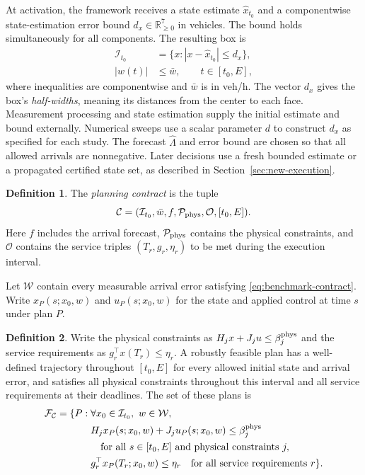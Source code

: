 \documentclass[preprint,12pt]{elsarticle}
\theoremstyle{definition}
\theoremstyle{plain}
\theoremstyle{definition}
\newtheorem{definition}{Definition}
\theoremstyle{plain}
\begin{document}
At activation, the framework receives a state estimate
$\widehat x_{t_0}$ and a componentwise state-estimation error bound
$d_x\in\mathbb R_{\ge0}^7$ in vehicles. The bound holds simultaneously
for all components. The resulting box is
\begin{equation}
\begin{aligned}
\mathcal I_{t_0}&=\{x:|x-\widehat x_{t_0}|\le d_x\},\\
|w(t)|&\le\bar w,\qquad t\in[t_0,E],
\end{aligned}
\label{eq:benchmark-contract}
\end{equation}
where inequalities are componentwise and $\bar w$ is in veh/h.
The vector $d_x$ gives the box's \emph{half-widths}, meaning its distances
from the center to each face. Measurement processing and state estimation
supply the initial estimate and bound externally. Numerical sweeps use a
scalar parameter $d$ to construct $d_x$ as specified for each study.
The forecast $\widehat\Lambda$ and error bound are chosen so that all
allowed arrivals are nonnegative. Later decisions use a fresh bounded
estimate or a propagated certified state set, as described in
Section~\ref{sec:new-execution}.
\begin{definition}
\label{def:planning-contract}
The \emph{planning contract} is the tuple
\[
\mathcal C=(\mathcal I_{t_0},\bar w,f,\mathcal P_{\rm phys},
\mathcal O,[t_0,E]).
\]
Here $f$ includes the arrival forecast, $\mathcal P_{\rm phys}$ contains
the physical constraints, and $\mathcal O$ contains the service triples
$(T_r,g_r,\eta_r)$ to be met during the execution interval.
\end{definition}
Let $\mathcal W$ contain every measurable arrival error satisfying
\eqref{eq:benchmark-contract}. Write $x_P(s;x_0,w)$ and $u_P(s;x_0,w)$
for the state and applied control at time $s$ under plan $P$.

\begin{definition}
\label{def:robust-feasibility}
Write the physical constraints as $H_jx+J_ju\le\beta_j^{\rm phys}$ and
the service requirements as $g_r^\top x(T_r)\le\eta_r$.
A robustly feasible plan has a well-defined trajectory throughout
$[t_0,E]$ for every allowed initial state and arrival error, and satisfies
all physical constraints throughout this interval and all service
requirements at their deadlines. The set of these plans is
\begin{equation}
\begin{aligned}
\mathcal F_{\mathcal C}=\{P:\;&\forall x_0\in\mathcal I_{t_0},\ w\in\mathcal W,\\
&H_jx_P(s;x_0,w)+J_ju_P(s;x_0,w)\le\beta_j^{\rm phys}\\
&\hspace{1em}\text{for all }s\in[t_0,E]\text{ and physical constraints }j,\\
&g_r^\top x_P(T_r;x_0,w)\le\eta_r
\quad\text{for all service requirements }r\}.
\end{aligned}
\label{eq:benchmark-feasible-set}
\end{equation}
\end{definition}
\end{document}
